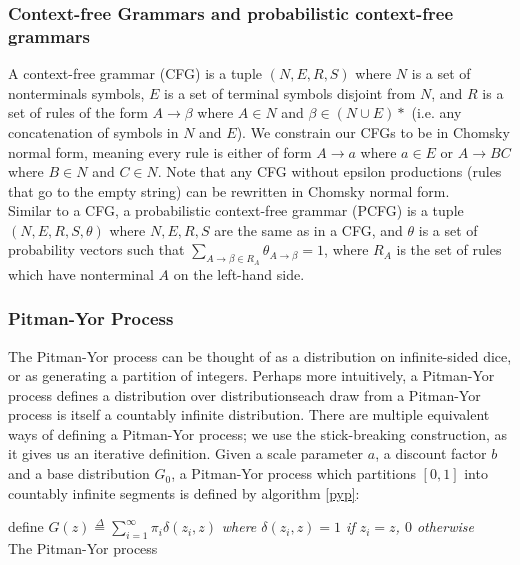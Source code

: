 \documentclass[12pt,letterpaper]{article}
\begin{document}
\subsubsection{Context-free Grammars and probabilistic context-free grammars}
A context-free grammar (CFG) is a tuple $(N, E, R, S)$ where $N$ is a set of nonterminals symbols, $E$ is a set of terminal symbols disjoint from $N$, and $R$ is a set of rules of the form $A \rightarrow \beta$ where $A \in N$ and $\beta \in (N \cup E)*$ (i.e. any concatenation of symbols in $N$ and $E$). We constrain our CFGs to be in Chomsky normal form, meaning every rule is either of form $A \rightarrow a$ where $a \in E$ or $A \rightarrow BC$ where $B\in N$ and $C\in N$. Note that any CFG without epsilon productions (rules that go to the empty string) can be rewritten in Chomsky normal form. \citep{hopcroft:2006}  \\

\noindent Similar to a CFG, a probabilistic context-free grammar (PCFG) is a tuple $(N, E, R, S, \theta)$ where $N,E,R,S$ are the same as in a CFG, and $\theta$ is a set of probability vectors such that $\sum\limits_{A\rightarrow \beta \in R_A} \theta_{A\rightarrow \beta} = 1$, where $R_A$ is the set of rules which have nonterminal $A$ on the left-hand side. 

\subsubsection{Pitman-Yor Process}
The Pitman-Yor process \citep{pitman:1997} can be thought of as a distribution on infinite-sided dice, or as generating a partition of integers. Perhaps more intuitively, a Pitman-Yor process defines a distribution over distributions\textemdash each draw from a Pitman-Yor process is itself a countably infinite distribution. There are multiple equivalent ways of defining a Pitman-Yor process; we use the stick-breaking construction, as it gives us an iterative definition. Given a scale parameter $a$, a discount factor $b$ and a base distribution $G_0$, a Pitman-Yor process which partitions $[0,1]$ into countably infinite segments is defined by algorithm \hyperref[pyp]{\ref*{pyp}}:\\

\begin{algorithm}[H]
define $G(z) \overset{\Delta}{=} \sum\limits_{i=1}^\infty \pi_i \delta(z_i, z)$ \emph{where $\delta(z_i,z) = 1$ if $z_i = z$, $0$ otherwise}\\
\caption{The Pitman-Yor process}
\label{pyp}
\end{algorithm} \citep{sethuraman:1994}
\end{document}
